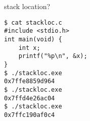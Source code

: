 
\begin{frame}[fragile,label=stackLoc1]{stack location?}
\begin{Verbatim}[fontsize=\fontsize{9}{10}\selectfont]
$ cat stackloc.c
#include <stdio.h>
int main(void) {
    int x;
    printf("%p\n", &x);
}
$ ./stackloc.exe
0x7ffe8859d964
$ ./stackloc.exe
0x7ffd4e26ac04
$ ./stackloc.exe
0x7ffc190af0c4
\end{Verbatim}
\end{frame}

